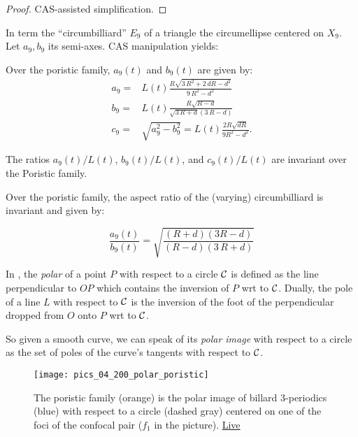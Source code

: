 \begin{proof} 
CAS-assisted simplification.
\end{proof}

In \cite{reznik2021-circum} term the ``circumbilliard'' $E_9$ of a triangle the circumellipse centered on $X_9$. Let $a_9,b_9$ its semi-axes. CAS manipulation yields:

\begin{corollary}
Over the poristic family, $a_9(t)$ and $b_9(t)$ are given by:
\begin{align*}
a_9=&L(t)\frac{R\sqrt {3\,{R}^{2}+2\,dR-{d}^{2}} }{9\,{R}^{2}-{d}^{2}}\\
b_9=&  L(t)\frac{R\sqrt {R-d}}{\sqrt {3\,R+d} (3\,R-d)}\\
  c_9=&\sqrt{a_9^2-b_9^2}=L(t)\frac{2R\sqrt{dR}}{9R^2-d^2}.
\end{align*}
\end{corollary}

\begin{corollary}
The ratios $a_9(t)/L(t)$, $b_9(t)/L(t)$, and $c_9(t)/L(t)$ are invariant over the Poristic family.
\end{corollary}

\begin{corollary}
Over the poristic family, the aspect ratio of the (varying) circumbilliard is invariant and given by:

\begin{equation*}
\frac{a_9(t)}{b_9(t)}=\sqrt{\frac { \left(  R+d \right)  \left( 3R-d \right) }{ \left( R-d
 \right)  \left( 3\,R+d \right) }}
\end{equation*}
\end{corollary}

In \cite[Polar]{mw}, the {\em polar} of a point $P$ with respect to a circle $\mathcal{C}$ is defined as the line perpendicular to $O P$ which contains the inversion of $P$ wrt to $\mathcal{C}$. Dually, the pole of a line $L$ with respect to $\mathcal{C}$ is the inversion of the foot of the perpendicular dropped from $O$ onto $P$ wrt to $\mathcal{C}$.

So given a smooth curve, we can speak of its {\em polar image} with respect to a circle as the set of poles of the curve's tangents with respect to $\mathcal{C}$. 

\begin{figure}
    \centering
    \texttt{[image: pics\_04\_200\_polar\_poristic]}
    \caption{The poristic family (orange) is the polar image of billard 3-periodics (blue) with respect to a circle (dashed gray) centered on one of the foci of the confocal pair ($f_1$ in the picture). \href{https://bit.ly/3nQ2wcH}{Live}}
    \label{fig:04-polar-poristic}
\end{figure}

